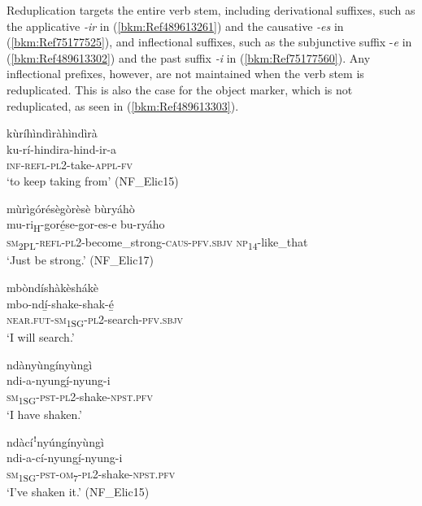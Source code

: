 \begin{sloppypar}
Reduplication targets the entire verb stem, including derivational suffixes, such as the applicative \textit{-ir} in (\ref{bkm:Ref489613261}) and the causative \textit{-es} in (\ref{bkm:Ref75177525}), and inflectional suffixes, such as the subjunctive suffix -\textit{e} in (\ref{bkm:Ref489613302}) and the past suffix \textit{-i} in (\ref{bkm:Ref75177560}). Any inflectional prefixes, however, are not maintained when the verb stem is reduplicated. This is also the case for the object marker, which is not reduplicated, as seen in (\ref{bkm:Ref489613303}).
\end{sloppypar}

\ea
\label{bkm:Ref489613261}
\glll kùríhìndìràhìndìrà\\
ku-rí-hindira-hind-ir-a\\
\textsc{inf}-\textsc{refl}-\textsc{pl}2-take-\textsc{appl}-\textsc{fv}\\
\glt ‘to keep taking from’ (NF\_Elic15)
\z

\ea
\label{bkm:Ref75177525}
mùrìgórésègòrèsè bùryáhò\\
\gll mu-ri\textsubscript{H}-goré̲se-gor-es-e          bu-ryáho\\
\textsc{sm}\textsubscript{2PL}-\textsc{refl}-\textsc{pl}2-become\_strong-\textsc{caus}-\textsc{pfv}.\textsc{sbjv}  \textsc{np}\textsubscript{14}-like\_that\\
\glt ‘Just be strong.’ (NF\_Elic17)
\z

\ea
\label{bkm:Ref489613302}
\glll mbòndíshàkèshákè\\
mbo-ndí̲-shake-shak-é̲\\
\textsc{near}.\textsc{fut}-\textsc{sm}\textsubscript{1SG}-\textsc{pl}2-search-\textsc{pfv}.\textsc{sbjv}\\
\glt ‘I will search.’
\z

\ea
\label{bkm:Ref75177560}
\glll ndànyùngínyùngì\\
ndi-a-nyungí̲-nyung-i\\
\textsc{sm}\textsubscript{1SG}-\textsc{pst}-\textsc{pl}2-shake-\textsc{npst}.\textsc{pfv}\\
\glt ‘I have shaken.’
\z

\ea
\label{bkm:Ref489613303}
\glll ndàcíꜝnyúngínyùngì\\
ndi-a-cí-nyungí̲-nyung-i\\
\textsc{sm}\textsubscript{1SG}-\textsc{pst}-\textsc{om}\textsubscript{7}-\textsc{pl}2-shake-\textsc{npst}.\textsc{pfv}\\
\glt ‘I’ve shaken it.’ (NF\_Elic15)
\z

